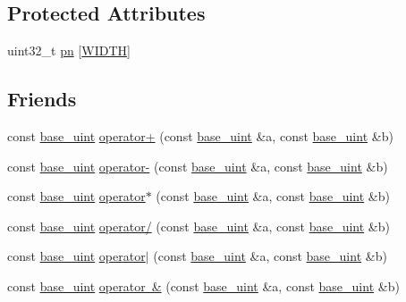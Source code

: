 \subsection*{Protected Attributes}
\begin{DoxyCompactItemize}
\item 
uint32\+\_\+t \mbox{\hyperlink{classbase__uint_a0edb1465d540fadd92b21659f27083a2}{pn}} \mbox{[}\mbox{\hyperlink{classbase__uint_afee51629f03ba95d823ab4ee94cf6c81adf579395d753e2d9607ecd61424f0853}{W\+I\+D\+TH}}\mbox{]}
\end{DoxyCompactItemize}
\subsection*{Friends}
\begin{DoxyCompactItemize}
\item 
const \mbox{\hyperlink{classbase__uint}{base\+\_\+uint}} \mbox{\hyperlink{classbase__uint_ab46abc7a4c02bbbe6ee4d44db58f36fd}{operator+}} (const \mbox{\hyperlink{classbase__uint}{base\+\_\+uint}} \&a, const \mbox{\hyperlink{classbase__uint}{base\+\_\+uint}} \&b)
\item 
const \mbox{\hyperlink{classbase__uint}{base\+\_\+uint}} \mbox{\hyperlink{classbase__uint_a42603f675219a79c1087da39677dd6d3}{operator-\/}} (const \mbox{\hyperlink{classbase__uint}{base\+\_\+uint}} \&a, const \mbox{\hyperlink{classbase__uint}{base\+\_\+uint}} \&b)
\item 
const \mbox{\hyperlink{classbase__uint}{base\+\_\+uint}} \mbox{\hyperlink{classbase__uint_a7cc93af608b4d2b8e45f8a18bb085cf0}{operator$\ast$}} (const \mbox{\hyperlink{classbase__uint}{base\+\_\+uint}} \&a, const \mbox{\hyperlink{classbase__uint}{base\+\_\+uint}} \&b)
\item 
const \mbox{\hyperlink{classbase__uint}{base\+\_\+uint}} \mbox{\hyperlink{classbase__uint_a3027097ea3718db496e486d5c64a6bbd}{operator/}} (const \mbox{\hyperlink{classbase__uint}{base\+\_\+uint}} \&a, const \mbox{\hyperlink{classbase__uint}{base\+\_\+uint}} \&b)
\item 
const \mbox{\hyperlink{classbase__uint}{base\+\_\+uint}} \mbox{\hyperlink{classbase__uint_af11d7776598f6633c139636314f065d6}{operator$\vert$}} (const \mbox{\hyperlink{classbase__uint}{base\+\_\+uint}} \&a, const \mbox{\hyperlink{classbase__uint}{base\+\_\+uint}} \&b)
\item 
const \mbox{\hyperlink{classbase__uint}{base\+\_\+uint}} \mbox{\hyperlink{classbase__uint_aa75064c879a5c59352c31ce6884dbf83}{operator \&}} (const \mbox{\hyperlink{classbase__uint}{base\+\_\+uint}} \&a, const \mbox{\hyperlink{classbase__uint}{base\+\_\+uint}} \&b)

\end{DoxyCompactItemize}
